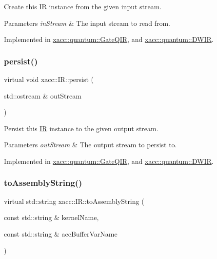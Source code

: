 Create this \hyperlink{a01677}{IR} instance from the given input stream.


\begin{DoxyParams}{Parameters}
{\em in\+Stream} & The input stream to read from. \\
\hline
\end{DoxyParams}


Implemented in \hyperlink{a01265_a07f26eeb362ac480d20da6cdc8c8fb39}{xacc\+::quantum\+::\+Gate\+Q\+IR}, and \hyperlink{a01217_a8b388d719d565bb902c979807d3d0d47}{xacc\+::quantum\+::\+D\+W\+IR}.

\mbox{\label{a01677_a414b72224d88473ad6190bb88102a3ea}} 
\subsubsection{\texorpdfstring{persist()}{persist()}}
{\footnotesize\ttfamily virtual void xacc\+::\+I\+R\+::persist (\begin{DoxyParamCaption}\item[{std\+::ostream \&}]{out\+Stream }\end{DoxyParamCaption})\hspace{0.3cm}{\ttfamily [pure virtual]}}

Persist this \hyperlink{a01677}{IR} instance to the given output stream.


\begin{DoxyParams}{Parameters}
{\em out\+Stream} & The output stream to persist to. \\
\hline
\end{DoxyParams}


Implemented in \hyperlink{a01265_a40e1d07e4dfd3794ef53fca3cdbdca61}{xacc\+::quantum\+::\+Gate\+Q\+IR}, and \hyperlink{a01217_abcbfd0a4cf697843391c65cbd9a82080}{xacc\+::quantum\+::\+D\+W\+IR}.

\mbox{\label{a01677_a8356cdff1919b88eabeb84fd7450cdb6}} 
\subsubsection{\texorpdfstring{to\+Assembly\+String()}{toAssemblyString()}}
{\footnotesize\ttfamily virtual std\+::string xacc\+::\+I\+R\+::to\+Assembly\+String (\begin{DoxyParamCaption}\item[{const std\+::string \&}]{kernel\+Name,  }\item[{const std\+::string \&}]{acc\+Buffer\+Var\+Name }\end{DoxyParamCaption})\hspace{0.3cm}{\ttfamily [pure virtual]}}

